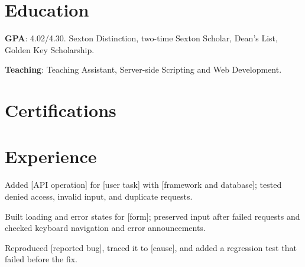 \documentclass{resume}
\begin{document}

\section{Education}

\begin{jobduties}
  \item \textbf{GPA}: 4.02/4.30. Sexton Distinction, two-time Sexton Scholar, Dean's List, Golden Key Scholarship.
  \item \textbf{Teaching}: Teaching Assistant, Server-side Scripting and Web Development.
\end{jobduties}


\section{Certifications}


\section{Experience}

\begin{jobduties}
  \item Added [API operation] for [user task] with [framework and database]; tested denied access, invalid input, and duplicate requests.
  \item Built loading and error states for [form]; preserved input after failed requests and checked keyboard navigation and error announcements.
  \item Reproduced [reported bug], traced it to [cause], and added a regression test that failed before the fix.
\end{jobduties}
\end{document}
